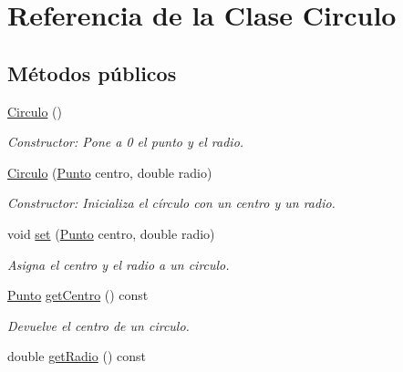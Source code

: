 \hypertarget{classCirculo}{}\section{Referencia de la Clase Circulo}
\label{classCirculo}
\subsection*{Métodos públicos}
\begin{DoxyCompactItemize}
\item 
\hyperlink{classCirculo_a6933bf908b78a4167684081a3a8f257f}{Circulo} ()\hypertarget{classCirculo_a6933bf908b78a4167684081a3a8f257f}{}\label{classCirculo_a6933bf908b78a4167684081a3a8f257f}

\begin{DoxyCompactList}\small\item\em Constructor\+: Pone a 0 el punto y el radio. \end{DoxyCompactList}\item 
\hyperlink{classCirculo_ad4c6c76f0227c25afcb872a8744ebe56}{Circulo} (\hyperlink{classPunto}{Punto} centro, double radio)\hypertarget{classCirculo_ad4c6c76f0227c25afcb872a8744ebe56}{}\label{classCirculo_ad4c6c76f0227c25afcb872a8744ebe56}

\begin{DoxyCompactList}\small\item\em Constructor\+: Inicializa el círculo con un centro y un radio. \end{DoxyCompactList}\item 
void \hyperlink{classCirculo_aa24cc4b316a3d9ece35f120d9b8e1fc4}{set} (\hyperlink{classPunto}{Punto} centro, double radio)\hypertarget{classCirculo_aa24cc4b316a3d9ece35f120d9b8e1fc4}{}\label{classCirculo_aa24cc4b316a3d9ece35f120d9b8e1fc4}

\begin{DoxyCompactList}\small\item\em Asigna el centro y el radio a un circulo. \end{DoxyCompactList}\item 
\hyperlink{classPunto}{Punto} \hyperlink{classCirculo_a022cde4d10d14a47a3b3921f80909f3b}{get\+Centro} () const \hypertarget{classCirculo_a022cde4d10d14a47a3b3921f80909f3b}{}\label{classCirculo_a022cde4d10d14a47a3b3921f80909f3b}

\begin{DoxyCompactList}\small\item\em Devuelve el centro de un circulo. \end{DoxyCompactList}\item 
double \hyperlink{classCirculo_a982f8a785d8a68ab1483b609cd752980}{get\+Radio} () const \hypertarget{classCirculo_a982f8a785d8a68ab1483b609cd752980}{}\label{classCirculo_a982f8a785d8a68ab1483b609cd752980}


\end{DoxyCompactItemize}

